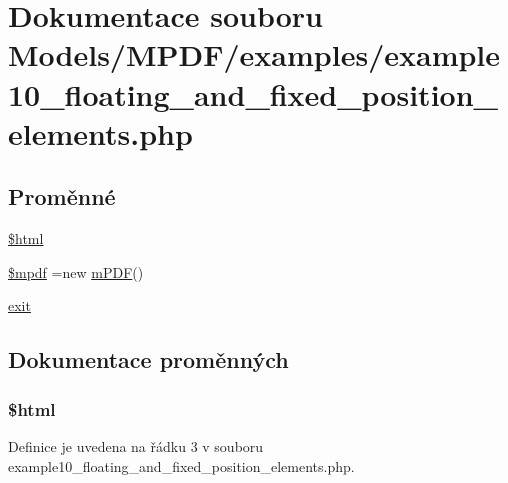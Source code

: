 \hypertarget{example10__floating__and__fixed__position__elements_8php}{\section{Dokumentace souboru Models/\-M\-P\-D\-F/examples/example10\-\_\-floating\-\_\-and\-\_\-fixed\-\_\-position\-\_\-elements.php}
\label{example10__floating__and__fixed__position__elements_8php}
}
\subsection*{Proměnné}
\begin{DoxyCompactItemize}
\item 
\hyperlink{example10__floating__and__fixed__position__elements_8php_a6f96e7fc92441776c9d1cd3386663b40}{\$html}
\item 
\hyperlink{example10__floating__and__fixed__position__elements_8php_ad028f81910d6cbab9b184d2214b3a8f8}{\$mpdf} =new \hyperlink{classm_p_d_f}{m\-P\-D\-F}()
\item 
\hyperlink{example10__floating__and__fixed__position__elements_8php_a6733eb5f605d09eaede9845835d71c4e}{exit}
\end{DoxyCompactItemize}


\subsection{Dokumentace proměnných}
\hypertarget{example10__floating__and__fixed__position__elements_8php_a6f96e7fc92441776c9d1cd3386663b40}{
\subsubsection[{\$html}]{\setlength{\rightskip}{0pt plus 5cm}\$html}}\label{example10__floating__and__fixed__position__elements_8php_a6f96e7fc92441776c9d1cd3386663b40}


Definice je uvedena na řádku 3 v souboru example10\-\_\-floating\-\_\-and\-\_\-fixed\-\_\-position\-\_\-elements.\-php.

